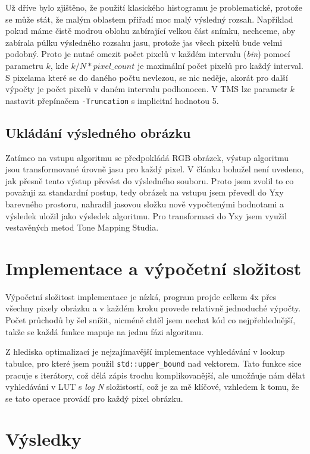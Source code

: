 \documentclass[11pt,a4paper,oneside]{article}
\begin{document}
Už dříve bylo zjištěno, že použití klasického histogramu je problematické,
protože se může stát, že malým oblastem přiřadí moc malý výsledný rozsah.
Například pokud máme čistě modrou oblohu zabírající velkou část snímku,
nechceme, aby zabírala půlku výsledného rozsahu jasu, protože jas všech pixelů
bude velmi podobný. Proto je nutné
omezit počet pixelů v každém intervalu (\textit{bin}) pomocí parametru $ k $, kde
$k/N*pixel\_count$ je maximální počet pixelů pro každý interval. S pixelama které
se do daného počtu nevlezou, se nic neděje, akorát pro další výpočty je počet
pixelů v daném intervalu podhonocen. V TMS lze parametr $ k $ nastavit přepínačem
\texttt{-Truncation} s implicitní hodnotou 5.

\subsection{Ukládání výsledného obrázku}

Zatímco na vstupu algoritmu se předpokládá RGB obrázek, výstup algoritmu jsou
transformované úrovně jasu pro každý pixel. V článku bohužel není uvedeno, jak
přesně tento výstup převést do výsledného souboru. Proto jsem zvolil to co
považuji za standardní postup, tedy obrázek na vstupu jsem převedl do Yxy barevného
prostoru, nahradil jasovou složku nově vypočtenými hodnotami a výsledek uložil
jako výsledek algoritmu. Pro transformaci do Yxy jsem využil vestavěných metod
Tone Mapping Studia.

\section{Implementace a výpočetní složitost}

Výpočetní složitost implementace je nízká, program projde celkem 4x
přes všechny pixely obrázku a v každém kroku provede relativně jednoduché výpočty. 
Počet průchodů by šel snížit, nicméně chtěl jsem nechat kód co nejpřehlednější,
takže se každá funkce mapuje na jednu fázi algoritmu.

Z hlediska optimalizací je nejzajímavější implementace vyhledávání v lookup
tabulce, pro které jsem použil \texttt{std::upper\_bound} nad vektorem.
Tato funkce sice pracuje s iterátory, což dělá zápis trochu komplikovanější,
ale umožňuje nám dělat vyhledávání v LUT s \emph{log N} složistostí,
což je za mě klíčové, vzhledem k tomu, že se tato operace provádí pro každý
pixel obrázku.

\section{Výsledky}
\end{document}
